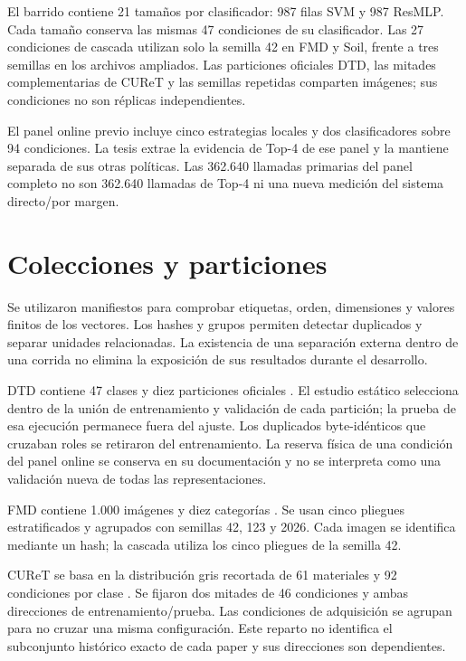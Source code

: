 El barrido contiene 21 tamaños por clasificador: 987 filas SVM y 987 ResMLP. Cada tamaño conserva las mismas 47 condiciones de su clasificador. Las 27 condiciones de cascada utilizan solo la semilla 42 en FMD y Soil, frente a tres semillas en los archivos ampliados. Las particiones oficiales DTD, las mitades complementarias de CUReT y las semillas repetidas comparten imágenes; sus condiciones no son réplicas independientes.

El panel online previo incluye cinco estrategias locales y dos clasificadores sobre 94 condiciones. La tesis extrae la evidencia de Top-4 de ese panel y la mantiene separada de sus otras políticas. Las 362.640 llamadas primarias del panel completo no son 362.640 llamadas de Top-4 ni una nueva medición del sistema directo/por margen.

\section{Colecciones y particiones}
Se utilizaron manifiestos para comprobar etiquetas, orden, dimensiones y valores finitos de los vectores. Los hashes y grupos permiten detectar duplicados y separar unidades relacionadas. La existencia de una separación externa dentro de una corrida no elimina la exposición de sus resultados durante el desarrollo.

DTD contiene 47 clases y diez particiones oficiales \citep{cimpoi2014dtd}. El estudio estático selecciona dentro de la unión de entrenamiento y validación de cada partición; la prueba de esa ejecución permanece fuera del ajuste. Los duplicados byte-idénticos que cruzaban roles se retiraron del entrenamiento. La reserva física de una condición del panel online se conserva en su documentación y no se interpreta como una validación nueva de todas las representaciones.

FMD contiene 1.000 imágenes y diez categorías \citep{sharan2013fmd}. Se usan cinco pliegues estratificados y agrupados con semillas 42, 123 y 2026. Cada imagen se identifica mediante un hash; la cascada utiliza los cinco pliegues de la semilla 42.

CUReT se basa en la distribución gris recortada de 61 materiales y 92 condiciones por clase \citep{varma2003filter}. Se fijaron dos mitades de 46 condiciones y ambas direcciones de entrenamiento/prueba. Las condiciones de adquisición se agrupan para no cruzar una misma configuración. Este reparto no identifica el subconjunto histórico exacto de cada paper y sus direcciones son dependientes.

